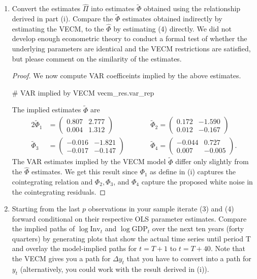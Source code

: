 \documentclass[oneside,reqno]{amsart}
\theoremstyle{definition}
\begin{document}
\begin{enumerate}[label=(\roman*)]
\item
Convert the estimates $\widehat \Pi$ into estimates $\widetilde \Phi$ obtained using the relationship derived in part (i). Compare the $\widetilde \Phi$ estimates obtained indirectly by estimating the VECM, to the $\widehat\Phi$ by estimating (4) directly. We did not develop enough econometric theory to conduct a formal test of whether the underlying parameters are identical and the VECM restrictions are satisfied, but please comment on the similarity of the estimates.

\begin{proof}
We now compute VAR coefficeints implied by the above estimates.
\begin{python3code}
# VAR implied by VECM 
vecm_res.var_rep
\end{python3code}

The implied estimates $\widetilde \Phi$ are
\begin{alignat*}{2}
	\widetilde \Phi_1 &= \begin{pmatrix}
		0.807 & 2.777 \\ 
		0.004 & 1.312
	\end{pmatrix} \qquad &&
	\widetilde \Phi_2= \begin{pmatrix}
		 0.172 & -1.590 \\ 
		0.012 & -0.167
	\end{pmatrix} \\
	\widetilde \Phi_3 &= \begin{pmatrix}
		 -0.016 & -1.821 \\ 
		-0.017 & -0.147
	\end{pmatrix} \qquad&&
	\widetilde \Phi_4  = \begin{pmatrix}
		-0.044 &  0.727  \\ 
		0.007 & -0.005 
	\end{pmatrix}.
\end{alignat*}
The VAR estimates implied by the VECM model $\widetilde \Phi$ differ only slightly from the $\widehat\Phi$ estimates. We get this result since $\Phi_1$ as define in (i) captures the cointegrating relation and $\Phi_2, \Phi_3$, and $\Phi_4$ capture the proposed white noise in the cointegrating residuals. \end{proof}

\item
Starting from the last $p$ observations in your sample iterate (3) and
(4) forward conditional on their respective OLS parameter estimates.
Compare the implied paths of $\log \text{Inv}_t$ and $\log \text{GDP}_t$ over the next ten years (forty quarters) by generating plots that show the actual time series until period T and overlay the model-implied paths for $t=T+1$
to $t = T + 40$. Note that the VECM gives you a path for $\Delta y_t$ that you have to convert into a path for $y_t$ (alternatively, you could work with the
result derived in (i)).


\end{enumerate}
\end{document}
